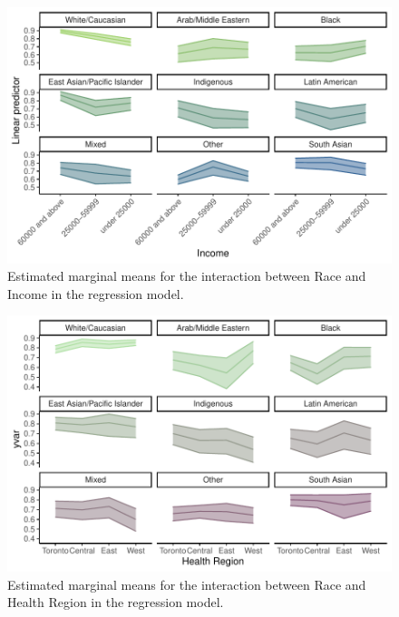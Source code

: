 \documentclass[
]{article}
\begin{document}
\begin{figure}

{\centering \includegraphics{appendix_files/figure-pdf/interaction-race-income-1.pdf}

}

\caption{Estimated marginal means for the interaction between Race and
Income in the regression model.}

\end{figure}

\begin{figure}

{\centering \includegraphics{appendix_files/figure-pdf/interaction-race-hr-1.pdf}

}

\caption{Estimated marginal means for the interaction between Race and
Health Region in the regression model.}

\end{figure}
\end{document}
